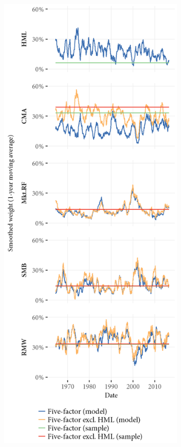 \begin{figure}[htbp]
  \begin{subfigure}{0.45\textwidth}
    \includegraphics[width=\textwidth]{graphics/Weights_5F_EXCL_HML_5F.png}

\end{subfigure}
\end{figure}
